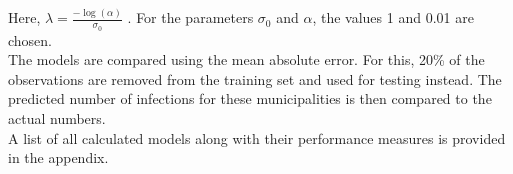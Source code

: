 Here, $\lambda=\frac{-\log\left(\alpha\right)}{\sigma_0}$ \cite{martins2014penalising}.
For the parameters $\sigma_0$ and $\alpha$, the values 1 and 0.01 are chosen. \\
The models are compared using the mean absolute error. For this, 20\% of the observations are removed from the training set and used for testing instead. The predicted number of infections for these municipalities is then compared to the actual numbers.
\\
A list of all calculated models along with their performance measures is provided in the appendix.

